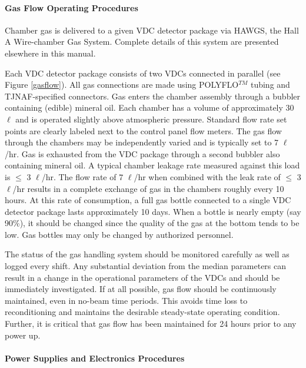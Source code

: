 \paragraph {Gas Flow Operating Procedures}

Chamber gas is delivered to a given VDC detector package via HAWGS,
the Hall A Wire-chamber Gas System.  Complete details of this system
are presented elsewhere in this manual.

Each VDC detector package consists of two VDCs connected in parallel
(see Figure \ref{gasflow}).  All gas connections are made using
POLYFLO$^{TM}$ tubing and TJNAF-specified connectors.  Gas enters the
chamber assembly through a bubbler containing (edible) mineral oil.
Each chamber has a volume of approximately 30 $\ell$ and is operated
slightly above atmospheric pressure.  Standard flow rate set points
are clearly labeled next to the control panel flow meters.  The gas
flow through the chambers may be independently varied and is typically
set to 7 $\ell$/hr.  Gas is exhausted from the VDC package through a
second bubbler also containing mineral oil.  A typical chamber leakage
rate measured against this load is $\le$ 3 $\ell$/hr.  The flow rate of
7 $\ell$/hr when combined with the leak rate of $\le$ 3 $\ell$/hr
results in a complete exchange of gas in the chambers roughly every
10 hours.  At this rate of consumption, a full gas bottle connected to
a single VDC detector package lasts approximately 10 days.  When a
bottle is nearly empty (say 90\%), it should be changed since the
quality of the gas at the bottom tends to be low.  Gas bottles may
only be changed by authorized personnel.


The status of the gas handling system should be monitored carefully
as well as logged every shift.  Any substantial deviation from the
median parameters can result in a change in the operational parameters
of the VDCs and should be immediately investigated.  If at all
possible, gas flow should be continuously maintained, even in
no-beam time periods.   This avoids time loss to reconditioning and
maintains the desirable steady-state operating condition.  Further,
it is critical that gas flow has been maintained for 24 hours prior
to any power up.

\paragraph{Power Supplies and Electronics Procedures}

